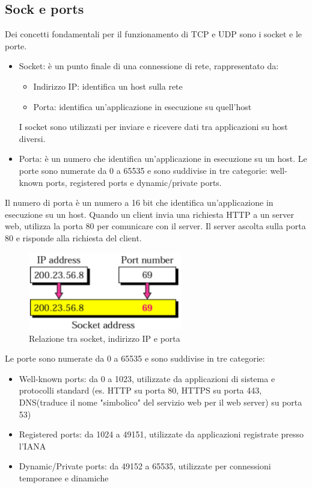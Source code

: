 \subsection{Sock e ports}
Dei concetti fondamentali per il funzionamento di TCP e UDP sono i socket e le porte.
\begin{itemize}
    \item Socket: è un punto finale di una connessione di rete, rappresentato da:
    \begin{itemize}
        \item Indirizzo IP: identifica un host sulla rete
        \item Porta: identifica un'applicazione in esecuzione su quell'host 
    \end{itemize}
    I socket sono utilizzati per inviare e ricevere dati tra applicazioni su host diversi.
    \item Porta: è un numero che identifica un'applicazione in esecuzione su un host. Le porte sono numerate da 0 a 65535 e sono suddivise in tre categorie: well-known ports, registered ports e dynamic/private ports.
\end{itemize}
Il numero di porta è un numero a 16 bit che identifica un'applicazione in esecuzione su un host. Quando un client invia una richiesta HTTP a un server web, utilizza la porta 80 per comunicare con il server. Il server ascolta sulla porta 80 e risponde alla richiesta del client.

\begin{figure}[h!]
    \centering
    \includegraphics[width=0.6\textwidth]{images/socket_port.png}
    \caption{Relazione tra socket, indirizzo IP e porta}
    \label{fig:socket_port}
\end{figure}

Le porte sono numerate da 0 a 65535 e sono suddivise in tre categorie:
\begin{itemize}
    \item Well-known ports: da 0 a 1023, utilizzate da applicazioni di sistema e protocolli standard (es. HTTP su porta 80, HTTPS su porta 443, DNS(traduce il nome "simbolico" del servizio web per il web server) su porta 53)
    \item Registered ports: da 1024 a 49151, utilizzate da applicazioni registrate presso l'IANA
    \item Dynamic/Private ports: da 49152 a 65535, utilizzate per connessioni temporanee e dinamiche
\end{itemize}

